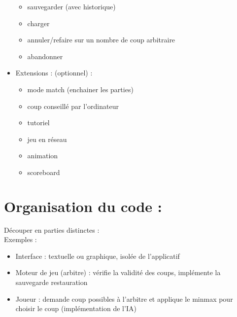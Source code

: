 \documentclass{article}
\begin{document}
\begin{itemize}
\begin{itemize}
  \item sauvegarder (avec historique)
  \item charger
  \item annuler/refaire sur un nombre de coup arbitraire
  \item abandonner
  \end{itemize}
\item Extensions : (optionnel) : 
  \begin{itemize}
  \item mode match (enchainer les parties)
  \item coup conseillé par l'ordinateur
  \item tutoriel
  \item jeu en réseau
  \item animation
  \item scoreboard
  \end{itemize}  
\end{itemize}
\newpage
\section{Organisation du code :}
Découper en parties distinctes :\\ 
Exemples :\\
\begin{itemize}
\item Interface : textuelle ou graphique, isolée de l'applicatif
\item Moteur de jeu (arbitre) : vérifie la validité des coups, implémente la sauvegarde restauration
\item Joueur : demande coup possibles à l'arbitre et applique le minmax pour choisir le coup (implémentation de l'IA)
\end{itemize}
\end{document}
